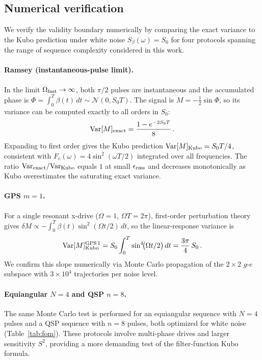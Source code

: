 \documentclass[aps,pra,twocolumn,superscriptaddress,longbibliography]{revtex4-2}
\newcommand{\be}{\begin{equation}}
\newcommand{\ee}{\end{equation}}
\begin{document}
\subsection{Numerical verification}
\label{sec:kubo_numerical}

We verify the validity boundary numerically by comparing the exact variance to the
Kubo prediction under white noise $S_\beta(\omega) = S_0$ for four protocols spanning
the range of sequence complexity considered in this work.

\paragraph{Ramsey (instantaneous-pulse limit).}
In the limit $\Omega_{\rm fast} \to \infty$, both $\pi/2$ pulses are instantaneous
and the accumulated phase is $\Phi = \int_0^T \beta(t)\,dt \sim \mathcal{N}(0,S_0 T)$.
The signal is $M = -\tfrac{1}{2}\sin\Phi$, so its variance can be computed exactly
to all orders in $S_0$:
\be
  \mathrm{Var}[M]_{\rm exact}
    = \frac{1 - e^{-2S_0 T}}{8}\,.
  \label{eq:ramsey_exact_var}
\ee
Expanding to first order gives the Kubo prediction
$\mathrm{Var}[M]_{\rm Kubo} = S_0 T/4$, consistent with
$F_e(\omega) = 4\sin^2(\omega T/2)$ integrated over all frequencies.
The ratio $\mathrm{Var}_{\rm exact}/\mathrm{Var}_{\rm Kubo}$ equals $1$ at small
$\epsilon_{\rm rms}$ and decreases monotonically as Kubo overestimates the saturating
exact variance.

\paragraph{GPS $m=1$.}
For a single resonant x-drive ($\Omega = 1$, $\Omega T = 2\pi$), first-order
perturbation theory gives $\delta M \propto -\int_0^T \beta(t)\sin^2(\Omega t/2)\,dt$,
so the linear-response variance is
\be
  \mathrm{Var}[M]_{\rm Kubo}^{\rm GPS\,1}
    = S_0 \int_0^T \sin^4\!\bigl(\Omega t/2\bigr)\,dt
    = \frac{3\pi}{4}\,S_0\,.
  \label{eq:gps1_kubo}
\ee
We confirm this slope numerically via Monte Carlo propagation of the $2\times 2$
$g$-$e$ subspace with $3\times 10^4$ trajectories per noise level.

\paragraph{Equiangular $N=4$ and QSP $n=8$.}
The same Monte Carlo test is performed for an equiangular sequence with $N=4$ pulses
and a QSP sequence with $n=8$ pulses, both optimized for white noise (Table~\ref{tab:fom}).
These protocols involve multi-phase drives and larger sensitivity $S^2$, providing
a more demanding test of the filter-function Kubo formula.
\end{document}
